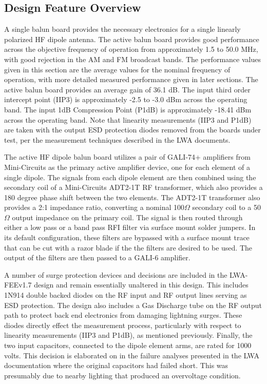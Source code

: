 \subsection{Design Feature Overview}
\label{subsec:technical:overview}
A single balun board provides the necessary electronics for a single linearly polarized HF dipole antenna.
The active balun board provides good performance across the objective frequency of operation from approximately 1.5 to 50.0 MHz, with good rejection in the AM and FM broadcast bands.
The performance values given in this section are the average values for the nominal frequency of operation, with more detailed measured performance given in later sections.
The active balun board provides an average gain of 36.1 dB.
The input third order intercept point (IIP3) is approximately -2.5 to -3.0 dBm across the operating band.
The input 1dB Compression Point (P1dB) is approximately -18.41 dBm across the operating band.
Note that linearity measurements (IIP3 and P1dB) are taken with the output ESD protection diodes removed from the boards under test, per the measurement techniques described in the LWA documents.

The active HF dipole balun board utilizes a pair of GALI-74+ amplifiers from Mini-Circuits as the primary active amplifier device, one for each element of a single dipole.
The signals from each dipole element are then combined using the secondary coil of a Mini-Circuits ADT2-1T RF transformer, which also provides a 180 degree phase shift between the two elements.
The ADT2-1T transformer also provides a 2:1 impedance ratio, converting a nominal 100$\Omega$ secondary coil to a 50$\Omega$ output impedance on the primary coil.
The signal is then routed through either a low pass or a band pass RFI filter via surface mount solder jumpers.
In its default configuration, these filters are bypassed with a surface mount trace that can be cut with a razor blade if the the filters are desired to be used.
The output of the filters are then passed to a GALI-6 amplifier.

A number of surge protection devices and decisions are included in the LWA-FEEv1.7 design and remain essentially unaltered in this design. 
This includes 1N914 double backed diodes on the RF input and RF output lines serving as ESD protection.
The design also includes a Gas Discharge tube on the RF output path to protect back end electronics from damaging lightning surges.
These diodes directly effect the measurement process, particularly with respect to linearity measurements (IIP3 and P1dB), as mentioned previously.
Finally, the two input capacitors, connected to the dipole element arms, are rated for 1000 volts.  
This decision is elaborated on in the failure analyses presented in the LWA documentation \cite{lwa_memo_190} where the original capacitors had failed short.
This was presumably due to nearby lighting that produced an overvoltage condition. 

